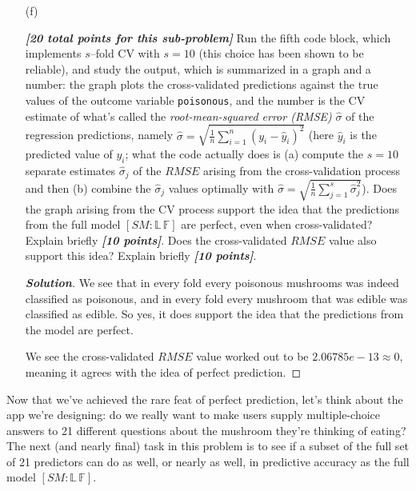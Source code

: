 \documentclass[12pt]{article}
\newenvironment{solution}{\begin{tcolorbox}[breakable]\begin{proof}[\textbf{\textit{Solution}}] }{\end{proof}\end{tcolorbox}}
\newcommand{\bi}[1]{\textbf{\textit{#1}}}
\begin{document}
\begin{itemize}

\item[(f)]

\bi{[20 total points for this sub-problem]} Run the fifth code block, which implements $s$--fold CV with $s = 10$ (this choice has been shown to be reliable), and study the output, which is summarized in a graph and a number: the graph plots the cross-validated predictions against the true values of the outcome variable \texttt{poisonous}, and the number is the CV estimate of what's called the \textit{root-mean-squared error (RMSE)} $\hat{ \sigma }$ of the regression predictions, namely $\hat{ \sigma } = \sqrt{ \frac{ 1 }{ n } \sum_{ i = 1 }^n ( y_i - \hat{ y }_i )^2 }$ (here $\hat{ y }_i$ is the predicted value of $y_i$; what the code actually does is (a) compute the $s = 10$ separate estimates $\hat{ \sigma }_j$ of the $RMSE$ arising from the cross-validation process and then (b) combine the $\hat{ \sigma }_j$ values optimally with $\hat{ \sigma } = \sqrt{ \frac{ 1 }{ n } \sum_{ j = 1 }^s \hat{ \sigma }_j^2 }$). Does the graph arising from the CV process support the idea that the predictions from the full model $[ SM \! \! : \! \mathbb{ L } \, \mathbb{ F } ]$ are perfect, even when cross-validated? Explain briefly \bi{[10 points]}. Does the cross-validated $RMSE$ value also support this idea? Explain briefly \bi{[10 points]}. 

\begin{solution}
    We see that in every fold every poisonous mushrooms was indeed classified as poisonous, and in every fold every mushroom that was edible was classified as edible. So yes, it does support the idea that the predictions from the model are perfect. 

    We see the cross-validated $RMSE$ value worked out to be $2.06785e-13 \approx 0$, meaning it agrees with the idea of perfect prediction. 
\end{solution}

\end{itemize}

Now that we've achieved the rare feat of perfect prediction, let's think about the app we're designing: do we really want to make users supply multiple-choice answers to 21 different questions about the mushroom they're thinking of eating?
The next (and nearly final) task in this problem is to see if a subset of the full set of 21 predictors can do as well, or nearly as well, in predictive accuracy as the full model $[ SM \! \! : \! \mathbb{ L } \, \mathbb{ F } ]$.
\end{document}
